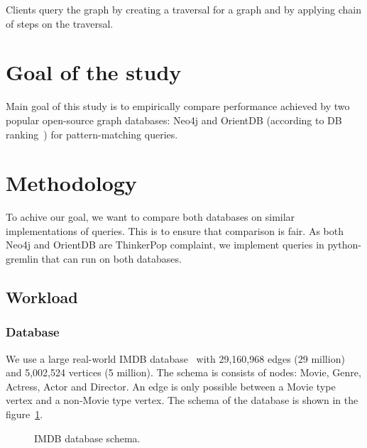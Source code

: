 Clients query the graph by creating a traversal for a graph and by applying chain of steps on the traversal.

\section{Goal of the study}

Main goal of this study is to empirically compare performance achieved by two popular open-source graph databases: Neo4j and OrientDB (according to DB ranking~\cite{dbranking}) for pattern-matching queries.

\section{Methodology}

To achive our goal, we want to compare both databases on similar implementations of queries. This is to ensure that comparison is fair. As both Neo4j and OrientDB are ThinkerPop complaint, we implement queries in python-gremlin that can run on both databases. 

\subsection{Workload}

\subsubsection{Database}

We use a large real-world IMDB database~\cite{IMDb96:online} with 29,160,968 edges (29 million) and 5,002,524 vertices (5 million). The schema is consists of nodes: Movie, Genre,
Actress, Actor and Director. An edge is only possible between a Movie type vertex and a non-Movie type vertex. 
The schema of the database is shown in the figure~\ref{fig:schema}. 

\begin{figure}[t]
\centering
{}
\caption{IMDB database schema.}
\label{fig:schema}
\centering
\end{figure}

